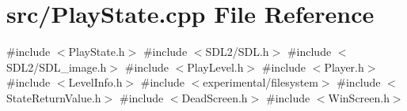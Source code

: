 \section{src/\+Play\+State.cpp File Reference}
\label{_play_state_8cpp}
{\ttfamily \#include $<$Play\+State.\+h$>$}\newline
{\ttfamily \#include $<$S\+D\+L2/\+S\+D\+L.\+h$>$}\newline
{\ttfamily \#include $<$S\+D\+L2/\+S\+D\+L\+\_\+image.\+h$>$}\newline
{\ttfamily \#include $<$Play\+Level.\+h$>$}\newline
{\ttfamily \#include $<$Player.\+h$>$}\newline
{\ttfamily \#include $<$Level\+Info.\+h$>$}\newline
{\ttfamily \#include $<$experimental/filesystem$>$}\newline
{\ttfamily \#include $<$State\+Return\+Value.\+h$>$}\newline
{\ttfamily \#include $<$Dead\+Screen.\+h$>$}\newline
{\ttfamily \#include $<$Win\+Screen.\+h$>$}\newline
